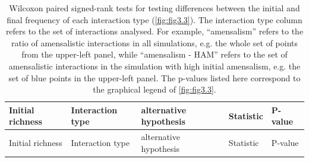 \begin{longtable}[]{@{}lllll@{}}
\caption[Distribution of interaction frequencies]{\color{Gray}Wilcoxon paired signed-rank tests for testing differences between the initial and final frequency of each interaction type (\cref{fig:fig3.3}). The interaction type column refers to the set of interactions analysed. For example, ``amensalism'' refers to the ratio of amensalistic interactions in all simulations, e.g. the whole set of points from the upper-left panel, while ``amensalism - HAM'' refers to the set of amensalistic interactions in the simulation with high initial amensalism, e.g. the set of blue points in the upper-left panel. The p-values listed here correspond to the graphical legend of \cref{fig:fig3.3}.}\label{tab:tableApp3.2.3}\\

\toprule
Initial richness & Interaction type & alternative hypothesis & Statistic & P-value\tabularnewline
\midrule
\endfirsthead
\toprule
Initial richness & Interaction type & alternative hypothesis & Statistic & P-value\tabularnewline
\midrule
\endhead


\end{longtable}
